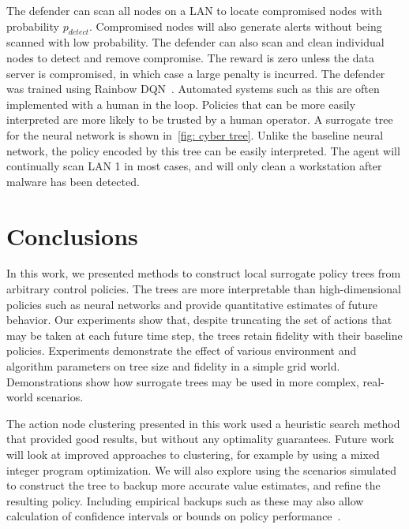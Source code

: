 \documentclass[letterpaper]{article} %
\begin{document}
The defender can scan all nodes on a LAN to locate compromised nodes with probability $p_{detect}$.
Compromised nodes will also generate alerts without being scanned with low probability.
The defender can also scan and clean individual nodes to detect and remove compromise.
The reward is zero unless the data server is compromised, in which case a large penalty is incurred.
The defender was trained using Rainbow DQN~\cite{hessel2018}.  Automated systems such as this are often implemented with a human in the loop.
Policies that can be more easily interpreted are more likely to be trusted by a human operator.
A surrogate tree for the neural network is shown in~\cref{fig: cyber tree}.
Unlike the baseline neural network, the policy encoded by this tree can be easily interpreted.
The agent will continually scan LAN 1 in most cases, and will only clean a workstation after malware has been detected.

\vspace{-1.02mm}
\section{Conclusions}
In this work, we presented methods to construct local surrogate policy trees from arbitrary control policies.
The trees are more interpretable than high-dimensional policies such as neural networks and provide quantitative estimates of future behavior.
Our experiments show that, despite truncating the set of actions that may be taken at each future time step, the trees retain fidelity with their baseline policies.
Experiments demonstrate the effect of various environment and algorithm parameters on tree size and fidelity in a simple grid world.
Demonstrations show how surrogate trees may be used in more complex, real-world scenarios.

The action node clustering presented in this work used a heuristic search method that provided good results, but without any optimality guarantees.
Future work will look at improved approaches to clustering, for example by using a mixed integer program optimization.
We will also explore using the scenarios simulated to construct the tree to backup more accurate value estimates, and refine the resulting policy.
Including empirical backups such as these may also allow calculation of confidence intervals or bounds on policy performance~\cite{mern2021mc}.
\end{document}
